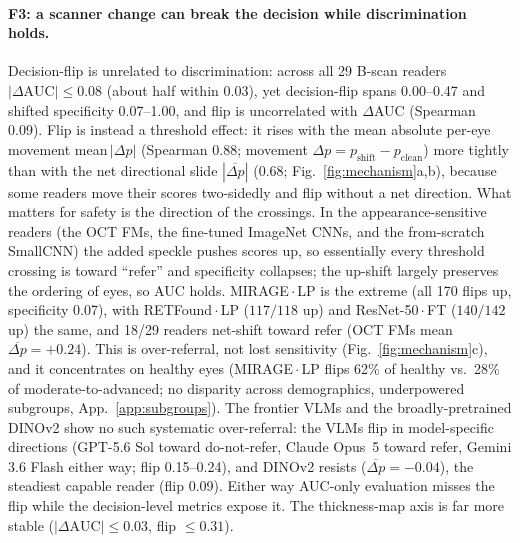 \paragraph{F3: a scanner change can break the decision while discrimination holds.}
Decision-flip is unrelated to discrimination: across all \num{29} B-scan readers $|\Delta\text{AUC}|\le\num{0.08}$
(about half within \num{0.03}), yet decision-flip spans \num{0.00}--\num{0.47} and shifted specificity \num{0.07}--\num{1.00},
and flip is uncorrelated with $\Delta$AUC (Spearman \num{0.09}). Flip is instead a threshold effect: it rises with the
mean absolute per-eye movement mean\,$|\Delta p|$ (Spearman \num{0.88}; movement $\Delta p =
p_{\text{shift}}-p_{\text{clean}}$) more tightly than with the net directional slide $|\overline{\Delta p}|$
(\num{0.68}; Fig.~\ref{fig:mechanism}a,b), because some readers move their scores two-sidedly and flip without a net
direction. What matters for safety is the direction of the crossings. In the appearance-sensitive readers (the OCT
FMs, the fine-tuned ImageNet CNNs, and the from-scratch SmallCNN) the added speckle pushes scores up, so essentially
every threshold crossing is toward ``refer'' and specificity collapses; the up-shift largely preserves the ordering
of eyes, so AUC holds. MIRAGE\,$\cdot$\,LP is the extreme (all \num{170} flips up, specificity \num{0.07}), with
RETFound\,$\cdot$\,LP ($117/118$ up) and ResNet-50\,$\cdot$\,FT ($140/142$ up) the same, and \num{18}/\num{29} readers
net-shift toward refer (OCT FMs mean $\overline{\Delta p}=+0.24$). This is over-referral, not lost sensitivity
(Fig.~\ref{fig:mechanism}c), and it concentrates on healthy eyes (MIRAGE\,$\cdot$\,LP flips \num{62}\% of healthy
vs.\ \num{28}\% of moderate-to-advanced; no disparity across demographics, underpowered subgroups,
App.~\ref{app:subgroups}). The frontier VLMs and the broadly-pretrained DINOv2 show no such systematic over-referral:
the VLMs flip in model-specific directions (GPT-5.6 Sol toward do-not-refer, Claude Opus~5 toward refer, Gemini 3.6 Flash
either way; flip \num{0.15}--\num{0.24}), and DINOv2 resists ($\overline{\Delta p}=-0.04$), the steadiest capable
reader (flip \num{0.09}). Either way AUC-only evaluation misses the flip while the decision-level metrics expose it.
The thickness-map axis is far more stable ($|\Delta\text{AUC}|\le\num{0.03}$, flip $\le\num{0.31}$).

